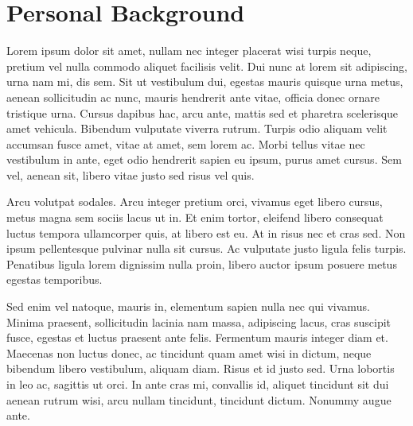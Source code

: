 \section*{Personal Background}

\begin{singlespace}
\bi
Lorem ipsum dolor sit amet, nullam nec integer placerat wisi turpis neque, pretium vel nulla commodo aliquet facilisis velit.
Dui nunc at lorem sit adipiscing, urna nam mi, dis sem.
Sit ut vestibulum dui, egestas mauris quisque urna metus, aenean sollicitudin ac nunc, mauris hendrerit ante vitae, officia donec ornare tristique urna.
Cursus dapibus hac, arcu ante, mattis sed et pharetra scelerisque amet vehicula.
Bibendum vulputate viverra rutrum.
Turpis odio aliquam velit accumsan fusce amet, vitae at amet, sem lorem ac.
Morbi tellus vitae nec vestibulum in ante, eget odio hendrerit sapien eu ipsum, purus amet cursus.
Sem vel, aenean sit, libero vitae justo sed risus vel quis.
\end{singlespace}

\begin{singlespace}
Arcu volutpat sodales.
Arcu integer pretium orci, vivamus eget libero cursus, metus magna sem sociis lacus ut in.
Et enim tortor, eleifend libero consequat luctus tempora ullamcorper quis, at libero est eu.
At in risus nec et cras sed.
Non ipsum pellentesque pulvinar nulla sit cursus.
Ac vulputate justo ligula felis turpis.
Penatibus ligula lorem dignissim nulla proin, libero auctor ipsum posuere metus egestas temporibus.
\end{singlespace}

\begin{singlespace}
Sed enim vel natoque, mauris in, elementum sapien nulla nec qui vivamus.
Minima praesent, sollicitudin lacinia nam massa, adipiscing lacus, cras suscipit fusce, egestas et luctus praesent ante felis.
Fermentum mauris integer diam et.
Maecenas non luctus donec, ac tincidunt quam amet wisi in dictum, neque bibendum libero vestibulum, aliquam diam.
Risus et id justo sed.
Urna lobortis in leo ac, sagittis ut orci.
In ante cras mi, convallis id, aliquet tincidunt sit dui aenean rutrum wisi, arcu nullam tincidunt, tincidunt dictum.
Nonummy augue ante.
\end{singlespace}
